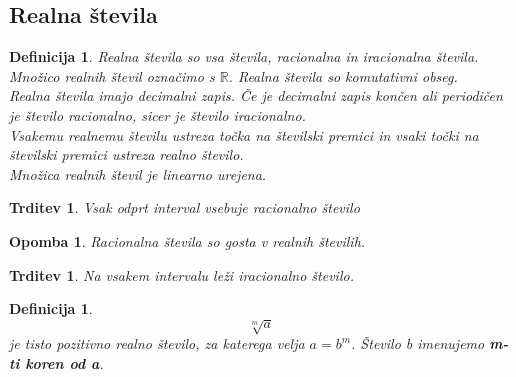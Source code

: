\documentclass[11pt]{article}
\newtheorem{Trditev}[Izrek]{{\sc Trditev}}
\newtheorem{Definicija}[Izrek]{{\sc Definicija}}
\newtheorem{Opomba}[Izrek]{{\sc Opomba}}
\begin{document}
\subsection{Realna števila}
\begin{Definicija}
	Realna števila so vsa števila, racionalna in iracionalna števila. Množico realnih števil označimo s $\mathbb{R}$. Realna števila so komutativni obseg.
	\\
	Realna števila imajo decimalni zapis. Če je decimalni zapis končen ali periodičen je število racionalno, sicer je število iracionalno.
	\\
	Vsakemu realnemu številu ustreza točka na številski premici in vsaki točki na številski premici ustreza realno število.
	\\
	Množica realnih števil je linearno urejena.
\end{Definicija}
\begin{Trditev}
	Vsak odprt interval vsebuje racionalno število
\end{Trditev}
\begin{Opomba}
	Racionalna števila so gosta v realnih številih.
\end{Opomba}
\begin{Trditev}
	Na vsakem intervalu leži iracionalno število.
\end{Trditev}
\begin{Definicija}
	$$\sqrt[m]{a}$$ je tisto pozitivno realno število, za katerega velja $ a = b^m$. Število b imenujemo \textbf{m-ti koren od a}.
\end{Definicija}
\end{document}
